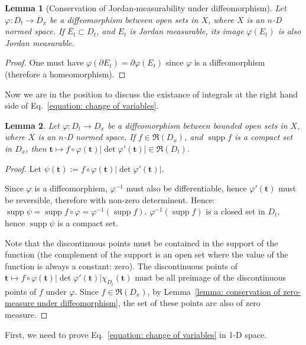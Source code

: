 \documentclass[openany]{book}
\theoremstyle{plain}
\newtheorem{lemma}{Lemma} %
\theoremstyle{definition}
\newcommand*{\bv}{\boldsymbol} %
\DeclareMathOperator{\supp}{supp}
\begin{document}
\begin{lemma}[Conservation of Jordan-measurability under diffeomorphism]
	\label{lemma: conservation of Jordan-measurability under diffeomorphism}
	Let $\varphi \colon D_t \to D_x$ be a diffeomorphism between open sets in $X$, where $X$ is an $n$-D normed space.
	If $\overline{E_t} \subset D_t$, and $E_t$ is Jordan measurable, its image $\varphi(E_t)$ is also Jordan measurable.
\end{lemma}
\begin{proof}
	One must have $\varphi(\partial E_t) = \partial \varphi(E_t)$ since $\varphi$ is a diffeomorphism (therefore a homeomorphism).
\end{proof}

Now we are in the position to discuss the existance of integrals at the right hand side of Eq.~\ref{equation: change of variables}.

\begin{lemma}
	Let $\varphi \colon D_t \to D_x$ be a diffeomorphism between bounded open sets in $X$, where $X$ is an $n$-D normed space. 
	If $f \in \mathfrak R(D_x)$, and $\supp f$ is a compact set in $D_x$, then $\bv t \mapsto f \circ \varphi(\bv t) |\det \varphi'(\bv t)| \in \mathfrak R(D_t)$. 
\end{lemma}
\begin{proof}
	Let $\psi(\bv t) := f \circ \varphi (\bv t) |\det \varphi'(\bv t)|$.

	Since $\varphi$ is a diffeomorphism, $\varphi^{-1}$ must also be differentiable, hence $\varphi'(\bv t)$ must be reversible, therefore with non-zero determinent. 
	Hence: $\supp \psi = \supp f \circ \varphi = \varphi^{-1}(\supp f)$. 
	$\varphi^{-1}(\supp f)$ is a closed set in $D_t$, hence $\supp \psi$ is a compact set.

	Note that the discontinuous points must be contained in the support of the function (the complement of the support is an open set where the value of the function is always a constant: zero).
	The discontinuous points of $\bv t \mapsto f \circ \varphi(\bv t) |\det \varphi'(\bv t)| \chi_{D_t}(\bv t)$ must be all preimage of the discontinuous points of $f$ under $\varphi$. 
	Since $f \in \mathfrak R(D_x)$, by Lemma~\ref{lemma: conservation of zero-measure under diffeomorphism}, the set of these points are also of zero measure.
\end{proof}

First, we need to prove Eq.~\ref{equation: change of variables} in 1-D space.
\end{document}
